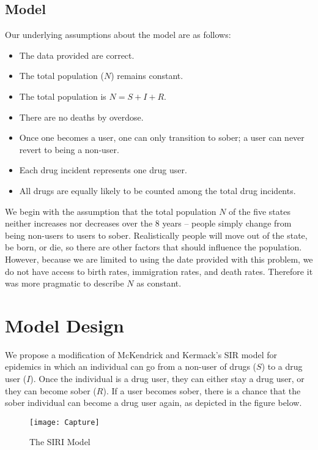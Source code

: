 \documentclass[12pt, letterpaper]{article}
\begin{document}
\subsection{Model}
Our underlying assumptions about the model are as follows:
    \begin{itemize}
        \item The data provided are correct.
        \item The total population ($N$) remains constant.
        \item The total population is $N = S + I + R$. 
        \item There are no deaths by overdose.
        \item Once one becomes a user, one can only transition to sober; a user can never revert to being a non-user.
        \item Each drug incident represents one drug user.
        \item All drugs are equally likely to be counted among the total drug incidents.
    \end{itemize}
    
We begin with the assumption that the total population $N$ of the five states neither increases nor decreases over the 8 years -- people simply change from being non-users to users to sober. Realistically people will move out of the state, be born, or die, so there are other factors that should influence the population. However, because we are limited to using the date provided with this problem, we do not have access to birth rates, immigration rates, and death rates. Therefore it was more pragmatic to describe $N$ as constant. 


\section{Model Design}
We propose a modification of McKendrick and Kermack's SIR model for epidemics \citep{contribution} in which an individual can go from a non-user of drugs ($S$) to a drug user ($I$). Once the individual is a drug user, they can either stay a drug user, or they can become sober ($R$). If a user becomes sober, there is a chance that the sober individual can become a drug user again, as depicted in the figure below.  

    \begin{figure}[h!]
    \centering
    \texttt{[image: Capture]}
    \caption{The SIRI Model}
    \label{fig:Capture}
    \end{figure}
\end{document}
